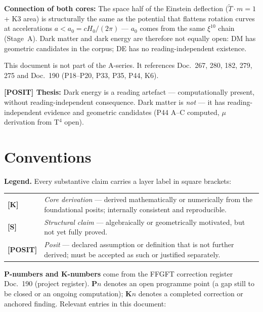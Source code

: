 \documentclass[11pt]{report}
\begin{document}
\medskip
\noindent\textbf{Connection of both cores:} The space half of the
Einstein deflection ($\tilde T \cdot m = 1$ + K3 area) is structurally
the same as the potential that flattens rotation curves at accelerations
$a < a_0 = cH_0/(2\pi)$ — $a_0$ comes from the same $\xi^{10}$ chain
(Stage~A). Dark matter and dark energy are therefore not equally open:
DM has geometric candidates in the corpus; DE has no reading-independent
existence.

This document is not part of the A-series. It references
Doc.~267, 280, 182, 279, 275 and Doc.~190 (P18--P20, P33, P35, P44, K6).

\medskip
\noindent\textbf{[POSIT] Thesis:} Dark energy is a reading artefact —
computationally present, without reading-independent consequence.
Dark matter is \emph{not} — it has reading-independent evidence and
geometric candidates (P44 A–C computed, $\mu$ derivation from T$^4$
open).

\section*{Conventions}

\noindent\textbf{Legend.} Every substantive claim carries a layer
label in square brackets:

\medskip
\begin{tabular}{@{}lp{11cm}}
\textbf{[K]}      & \emph{Core derivation} — derived mathematically
                    or numerically from the foundational posits;
                    internally consistent and reproducible. \\[4pt]
\textbf{[S]}      & \emph{Structural claim} — algebraically or
                    geometrically motivated, but not yet fully proved. \\[4pt]
\textbf{[POSIT]}  & \emph{Posit} — declared assumption or definition
                    that is not further derived; must be accepted as
                    such or justified separately. \\
\end{tabular}

\medskip
\noindent\textbf{P-numbers and K-numbers} come from the FFGFT
correction register Doc.~190 (project register). \textbf{P}$n$
denotes an open programme point (a gap still to be closed or an
ongoing computation); \textbf{K}$n$ denotes a completed correction
or anchored finding. Relevant entries in this document:
\end{document}

